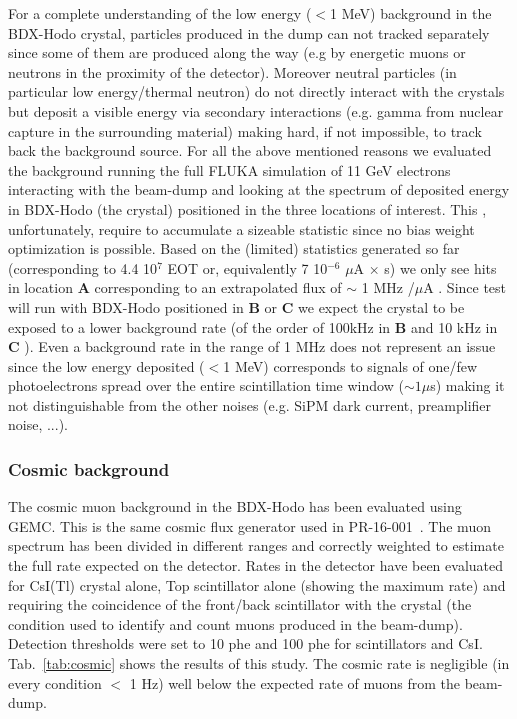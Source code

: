 For a complete understanding of the low energy ($<$1 MeV) background in the BDX-Hodo crystal, particles produced in the dump can not tracked separately since some of them are produced along the way (e.g by energetic muons or neutrons in the proximity of the detector).
Moreover  neutral particles (in particular low energy/thermal neutron) do not directly interact with the crystals but deposit a visible energy via secondary interactions (e.g. gamma from nuclear capture in the surrounding material) making hard, if not impossible,  to track back the background source. For all the above mentioned reasons we evaluated the background running the full FLUKA simulation of 11 GeV electrons interacting with the beam-dump and looking at the spectrum of deposited energy in BDX-Hodo (the crystal) positioned  in the three locations of interest. This , unfortunately, require to accumulate a sizeable statistic since no bias weight optimization is possible. Based on the (limited) statistics generated so far (corresponding to 4.4 10$^7$ EOT or, equivalently 7 10$^{-6}$ $\mu$A $\times$  s) we only see hits in location {\bf A} corresponding to an extrapolated flux of $\sim$ 1 MHz /$\mu$A .
Since test will run with BDX-Hodo positioned in   {\bf B} or {\bf C} we expect the crystal to be exposed to  a lower background rate (of the order of 100kHz in   {\bf B}  and 10 kHz in {\bf C} ). Even a background rate in the range of 1 MHz does not represent an issue since the low energy deposited ($<$1 MeV) corresponds to signals of one/few photoelectrons spread over the entire scintillation time window ($\sim 1 \mu$s) making it not distinguishable from the other noises (e.g. SiPM dark current, preamplifier noise, ...).








\subsubsection{Cosmic background}
The cosmic muon background in the BDX-Hodo has been evaluated using GEMC. This is the same cosmic flux generator used in PR-16-001~\cite{bdx-proposal}. The muon spectrum has been divided in different ranges  and correctly weighted to estimate the full rate expected on the detector. Rates in the detector have been evaluated for CsI(Tl) crystal alone, Top scintillator alone (showing the maximum rate) and requiring  the coincidence of the front/back scintillator with the crystal (the condition used to identify and count muons produced in the beam-dump). Detection thresholds were set to  10 phe and 100 phe for scintillators and CsI. Tab.~\ref{tab:cosmic} shows the results of this study. The cosmic rate is negligible (in every condition $<$ 1 Hz) well below the expected rate of muons from the beam-dump.

